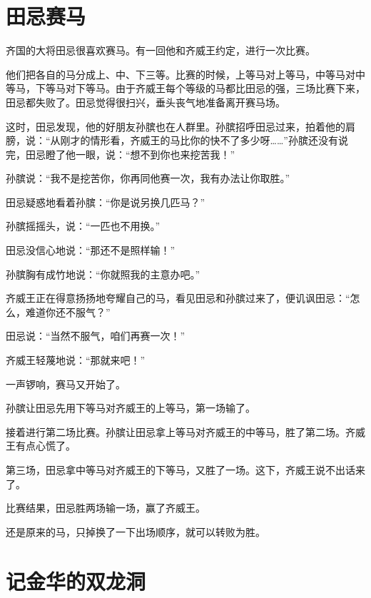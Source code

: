\documentclass[12pt,UTF-8,openany]{ctexbook}
\begin{document}
\chapter{田忌赛马}

\begin{Large}
    
    齐国的大将田忌很喜欢赛马。有一回他和齐威王约定，进行一次比赛。
    
    他们把各自的马分成上、中、下三等。比赛的时候，上等马对上等马，中等马对中等马，下等马对下等马。由于齐威王每个等级的马都比田忌的强，三场比赛下来，田忌都失败了。田忌觉得很扫兴，垂头丧气地准备离开赛马场。
    
    这时，田忌发现，他的好朋友孙膑也在人群里。孙膑招呼田忌过来，拍着他的肩膀，说：“从刚才的情形看，齐威王的马比你的快不了多少呀……”孙膑还没有说完，田忌瞪了他一眼，说：“想不到你也来挖苦我！”
    
    孙膑说：“我不是挖苦你，你再同他赛一次，我有办法让你取胜。”
    
    田忌疑惑地看着孙膑：“你是说另换几匹马？”
    
    孙膑摇摇头，说：“一匹也不用换。”
    
    田忌没信心地说：“那还不是照样输！”
    
    孙膑胸有成竹地说：“你就照我的主意办吧。”
    
    齐威王正在得意扬扬地夸耀自己的马，看见田忌和孙膑过来了，便讥讽田忌：“怎么，难道你还不服气？”
    
    田忌说：“当然不服气，咱们再赛一次！”
    
    齐威王轻蔑地说：“那就来吧！”
    
    一声锣响，赛马又开始了。
    
    孙膑让田忌先用下等马对齐威王的上等马，第一场输了。
    
    接着进行第二场比赛。孙膑让田忌拿上等马对齐威王的中等马，胜了第二场。齐威王有点心慌了。
    
    第三场，田忌拿中等马对齐威王的下等马，又胜了一场。这下，齐威王说不出话来了。
    
    比赛结果，田忌胜两场输一场，赢了齐威王。
    
    还是原来的马，只掉换了一下出场顺序，就可以转败为胜。
    
\end{Large}

\chapter{记金华的双龙洞}
\end{document}

